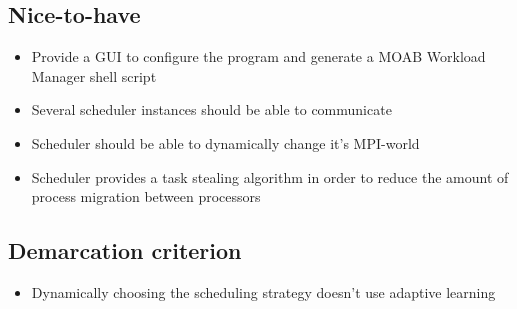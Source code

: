 	\subsection{Nice-to-have}
		\begin{itemize}
			\item Provide a GUI to configure the program and generate a MOAB Workload Manager shell script
			\item Several scheduler instances should be able to communicate
			\item Scheduler should be able to dynamically change it's MPI-world
			\item Scheduler provides a task stealing algorithm in order to reduce the amount of process migration between processors
		\end{itemize}
	\subsection{Demarcation criterion}
		\begin{itemize}
			\item Dynamically choosing the scheduling strategy doesn't use adaptive learning
		\end{itemize}